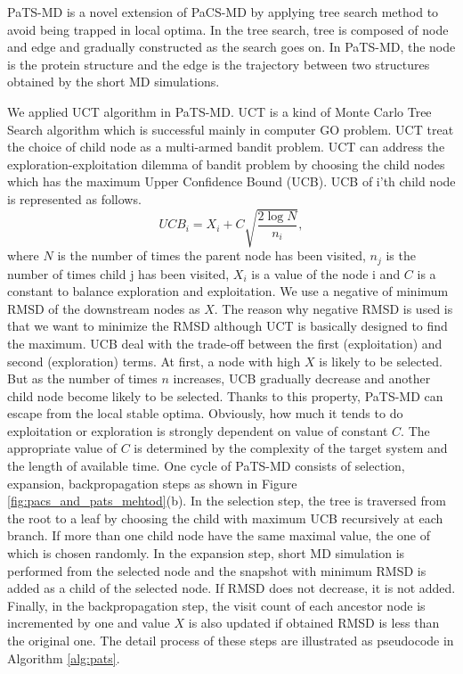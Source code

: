 PaTS-MD is a novel extension of PaCS-MD by applying tree search method to avoid being trapped in local optima. In the tree search, tree is composed of node and edge and gradually constructed as the search goes on. In PaTS-MD, the node is the protein structure and the edge is the trajectory between two structures obtained by the short MD simulations. 

We applied UCT algorithm in PaTS-MD. UCT is a kind of Monte Carlo Tree Search algorithm which is successful mainly in computer GO problem. UCT treat the choice of child node as a multi-armed bandit problem. UCT can address the exploration-exploitation dilemma of bandit problem by choosing the child nodes which has the maximum Upper Confidence Bound (UCB). UCB of i'th child node is represented as follows.
\begin{equation}
UCB_{i} = X_i + C \sqrt{\frac{2\log{N}}{n_i}},
\end{equation}
where $N$ is the number of times the parent node has been visited, $n_j$ is the number of times child j has been visited, $X_i$ is a value of the node i and $C$ is a constant to balance exploration and exploitation. We use a negative of minimum RMSD of the downstream nodes as $X$. The reason why negative RMSD is used is that we want to minimize the RMSD although UCT is basically designed to find the maximum. UCB deal with the trade-off between  the first (exploitation) and second (exploration) terms. At first, a node with high $X$ is likely  to be selected. But as the number of times $n$ increases, UCB gradually decrease and another child node become likely to be selected. Thanks to this property, PaTS-MD can escape from the local stable optima. Obviously, how much it tends to do exploitation or exploration is strongly dependent on value of constant $C$.
The appropriate value of $C$ is determined by the complexity of the target system and the length of available time.
One cycle of PaTS-MD consists of selection, expansion, backpropagation steps as shown in Figure \ref{fig:pacs_and_pats_mehtod}(b).
In the selection step, the tree is traversed from the root to a leaf by choosing the child with maximum UCB recursively at each branch. If more than one child node have the same maximal value, the one of which is chosen randomly. In the expansion step, short MD simulation is performed from the selected node and the snapshot with minimum RMSD is added as a child of the selected node. If RMSD does not decrease, it is not added. Finally, in the backpropagation step, the visit count of each ancestor node is incremented by one and value $X$ is also updated if obtained RMSD is less than the original one. The detail process of these steps are illustrated as pseudocode in Algorithm \ref{alg:pats}.

